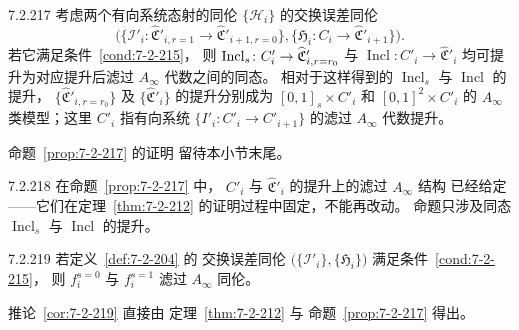 \begin{proposition}{7.2.217}\label{prop:7-2-217}
考虑两个有向系统态射的同伦
$\{\mathcal H_i\}$ 的交换误差同伦
\[
\bigl(
\{\mathcal I'_i\colon
\widehat{\mathfrak C}'_{i,r=1}
\to\widehat{\mathfrak C}'_{i+1,r=0}\},
\{\mathfrak H_i\colon C_i\to
\widehat{\mathfrak C}'_{i+1}\}
\bigr).
\]
若它满足条件~\ref{cond:7-2-215}，
则 $\operatorname{Incl}_s\liftIndex{I276}\colon C'_i\to
\widehat{\mathfrak C}'_{i,r=r_0}$
与 $\operatorname{Incl}\colon C'_i\to
\widehat{\mathfrak C}'_i$
均可提升为对应提升后滤过
$A_\infty$ 代数之间的同态。
相对于这样得到的
$\operatorname{Incl}_s$ 与
$\operatorname{Incl}$ 的提升，
$\{\widehat{\mathfrak C}'_{i,r=r_0}\}$
及 $\{\widehat{\mathfrak C}'_i\}$
的提升分别成为
$[0,1]_s\times C'_i$ 和
$[0,1]^2\times C'_i$ 的
$A_\infty$ 类模型；这里 $C'_i$
指有向系统 $\{I'_i\colon C'_i\to C'_{i+1}\}$
的滤过 $A_\infty$ 代数提升。
\end{proposition}

命题~\ref{prop:7-2-217} 的证明
留待本小节末尾。

\begin{remark}{7.2.218}\label{rem:7-2-218}
在命题~\ref{prop:7-2-217} 中，
$C'_i$ 与 $\widehat{\mathfrak C}'_i$
的提升上的滤过 $A_\infty$ 结构
已经给定——它们在定理~\ref{thm:7-2-212}
的证明过程中固定，不能再改动。
命题只涉及同态
$\operatorname{Incl}_s$ 与
$\operatorname{Incl}$ 的提升。
\end{remark}

\begin{corollary}{7.2.219}\label{cor:7-2-219}
若定义~\ref{def:7-2-204} 的
交换误差同伦
$\bigl(\{\mathcal I'_i\},\{\mathfrak H_i\}\bigr)$
满足条件~\ref{cond:7-2-215}，
则 $f_i^{s=0}$ 与 $f_i^{s=1}$
滤过 $A_\infty$ 同伦。
\end{corollary}

推论~\ref{cor:7-2-219} 直接由
定理~\ref{thm:7-2-212} 与
命题~\ref{prop:7-2-217} 得出。
